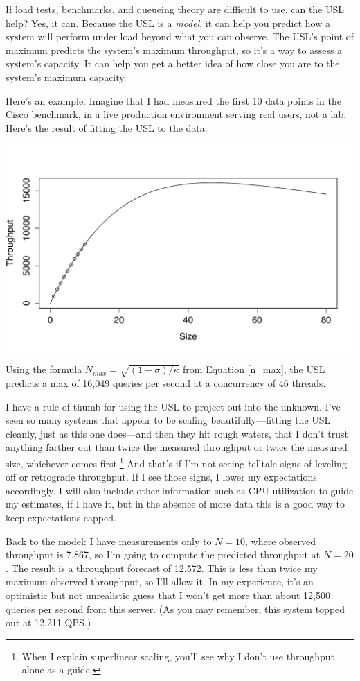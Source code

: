 \documentclass{vivid_layout}
\begin{document}
If load tests, benchmarks, and queueing theory are difficult to use, can the USL
help? Yes, it can.  Because the USL is a {\itshape model}, it can help you
predict how a system will perform under load beyond what you can observe. The
USL's point of maximum predicts the system's maximum throughput, so it's a way
to assess a system's capacity.  It can help you get a better idea of how close
you are to the system's maximum capacity.

Here's an example. Imagine that I had measured the first 10 data points in the
Cisco benchmark, in a live production environment serving real users, not a
lab. Here's the result of fitting the USL to the data:
\begin{center}
\includegraphics[width=.85\linewidth]{scalability/cisco-2}
\end{center}

Using the formula $N_{max}=\sqrt{(1-\sigma)/\kappa}$ from Equation \ref{n_max}, the USL predicts a
max of 16,049 queries per second at a concurrency of 46 threads.

I have a rule of thumb for using the USL to project out into the unknown. I've
seen so many systems that appear to be scaling beautifully---fitting the USL
cleanly, just as this one does---and then they hit rough waters, that I don't
trust anything farther out than twice the measured throughput or twice the
measured size, whichever comes first.\footnote{When I explain superlinear
scaling, you'll see why I don't use throughput alone as a guide.} And that's if
I'm not seeing telltale signs of leveling off or retrograde throughput. If I see
those signs, I lower my expectations accordingly. I will also include other
information such as CPU utilization to guide my estimates, if I have it, but in
the absence of more data this is a good way to keep expectations capped.

Back to the model: I have measurements only to $N=10$, where observed throughput
is 7,867, so I'm going to compute the predicted throughput at $N=20$. The result
is a throughput forecast of 12,572. This is less than twice my maximum
observed throughput, so I'll allow it. In my experience, it's an optimistic but
not unrealistic guess that I won't get more than about 12,500 queries per second
from this server. (As you may remember, this system topped out at 12,211 QPS.)
\end{document}

